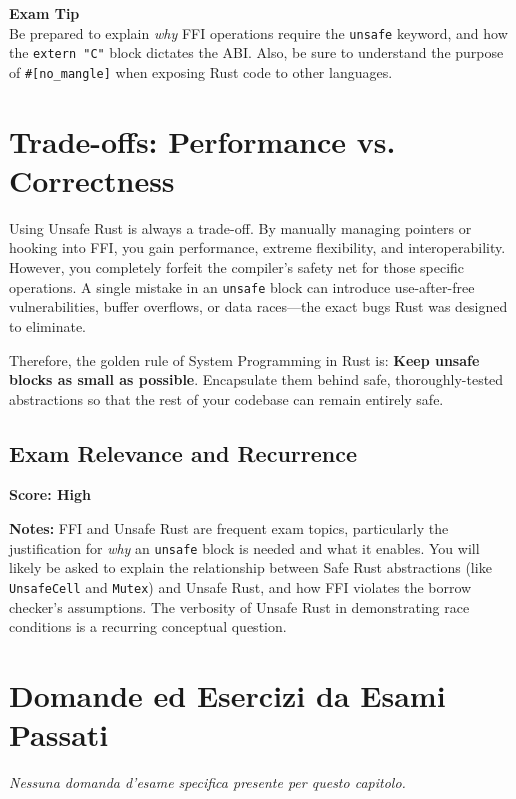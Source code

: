 \begin{exambox}
\textbf{Exam Tip}\\
Be prepared to explain \textit{why} FFI operations require the \texttt{unsafe} keyword, and how the \texttt{extern "C"} block dictates the ABI. Also, be sure to understand the purpose of \texttt{\#[no\_mangle]} when exposing Rust code to other languages.
\end{exambox}

\section{Trade-offs: Performance vs. Correctness}

Using Unsafe Rust is always a trade-off. By manually managing pointers or hooking into FFI, you gain performance, extreme flexibility, and interoperability. However, you completely forfeit the compiler's safety net for those specific operations. A single mistake in an \texttt{unsafe} block can introduce use-after-free vulnerabilities, buffer overflows, or data races---the exact bugs Rust was designed to eliminate.

Therefore, the golden rule of System Programming in Rust is: \textbf{Keep unsafe blocks as small as possible}. Encapsulate them behind safe, thoroughly-tested abstractions so that the rest of your codebase can remain entirely safe.

\subsection*{Exam Relevance and Recurrence}
\textbf{Score: High}

\textbf{Notes:} FFI and Unsafe Rust are frequent exam topics, particularly the justification for \textit{why} an \texttt{unsafe} block is needed and what it enables. You will likely be asked to explain the relationship between Safe Rust abstractions (like \texttt{UnsafeCell} and \texttt{Mutex}) and Unsafe Rust, and how FFI violates the borrow checker's assumptions. The verbosity of Unsafe Rust in demonstrating race conditions is a recurring conceptual question.

\section{Domande ed Esercizi da Esami Passati}

\textit{Nessuna domanda d'esame specifica presente per questo capitolo.}
